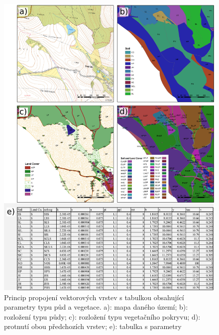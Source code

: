 \begin{figure}[h!]
  \centering
  \includegraphics[width=1.0\textwidth]{./img/LUplusTAB.png} 
  \caption{Princip propojení vektorových vrstev s tabulkou obsahující parametry typu půd a vegetace. a): mapa daného území;  b): rozložení typu půdy; c):  rozložení typu vegetačního pokryvu; d): protnutí obou předchozích vrstev; e): tabulka s parametry}
  \label{fig:pripravapar_vyrez}
\end{figure}






























